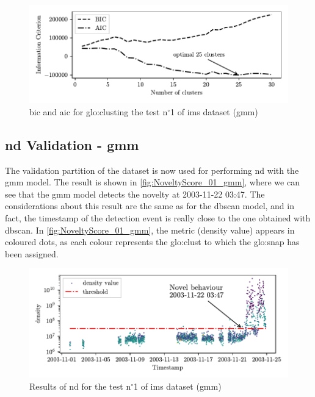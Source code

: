 \begin{figure}
    \centering
    \includegraphics{images/IMS/BICAIC_GMM.pdf}
    \caption{\gls{bic} and \gls{aic} for \gls{glo:clust}ing the test $\text{n}^\circ$1 of \gls{ims} dataset (\gls{gmm})}
    \label{fig:bic_aic_gmm}
\end{figure}

\subsection{\gls{nd} Validation - \gls{gmm}}
The validation partition of the dataset is now used for performing \gls{nd} with the \gls{gmm} model. The result is shown in \autoref{fig:NoveltyScore_01_gmm}, where we can see that the \gls{gmm} model detects the novelty at 2003-11-22 03:47. The considerations about this result are the same as for the \gls{dbscan} model, and in fact, the timestamp of the detection event is really close to the one obtained with \gls{dbscan}. In \autoref{fig:NoveltyScore_01_gmm}, the metric (density value) appears in coloured dots, as each colour represents the \gls{glo:clust} to which the \gls{glo:snap} has been assigned.
\begin{figure}
    \centering
    \includegraphics{images/IMS/Novelty_01_500samples_bearing3x_gmm.pdf}
    \caption{Results of \gls{nd} for the test $\text{n}^\circ$1 of \gls{ims} dataset (\gls{gmm})}
    \label{fig:NoveltyScore_01_gmm}
\end{figure}

